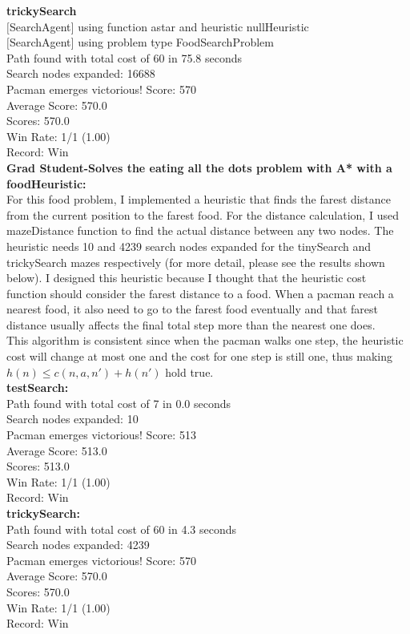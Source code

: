 \documentclass[11pt]{article}
\begin{document}
\noindent
\textbf{trickySearch}\\
$[$SearchAgent$]$ using function astar and heuristic nullHeuristic\\
$[$SearchAgent$]$ using problem type FoodSearchProblem\\
Path found with total cost of 60 in 75.8 seconds\\
Search nodes expanded: 16688\\
Pacman emerges victorious! Score: 570\\
Average Score: 570.0\\
Scores:        570.0\\
Win Rate:      1/1 (1.00)\\
Record:        Win\\

\newpage
\noindent
\textbf{Grad Student-Solves the eating all the dots problem with A* with a foodHeuristic:}\\
For this food problem, I implemented a heuristic that finds the farest distance from the current position to the farest food. For the distance calculation, I used mazeDistance function to find the actual distance between any two nodes. The heuristic needs 10 and 4239 search nodes expanded for the tinySearch and trickySearch mazes respectively (for more detail, please see the results shown below). I designed this heuristic because I thought that the heuristic cost function should consider the farest distance to a food. When a pacman reach a nearest food, it also need to go to the farest food eventually and that farest distance usually affects the final total step more than the nearest one does.\\

\noindent
This algorithm is consistent since when the pacman walks one step, the heuristic cost will change at most one and the cost for one step is still one, thus making $h(n) \leq c(n, a, n') + h(n')$ hold true.\\

\noindent
\textbf{testSearch:}\\
Path found with total cost of 7 in 0.0 seconds\\
Search nodes expanded: 10\\
Pacman emerges victorious! Score: 513\\
Average Score: 513.0\\
Scores:        513.0\\
Win Rate:      1/1 (1.00)\\
Record:        Win\\

\noindent
\textbf{trickySearch:}\\
Path found with total cost of 60 in 4.3 seconds\\
Search nodes expanded: 4239\\
Pacman emerges victorious! Score: 570\\
Average Score: 570.0\\
Scores:        570.0\\
Win Rate:      1/1 (1.00)\\
Record:        Win\\
\end{document}
